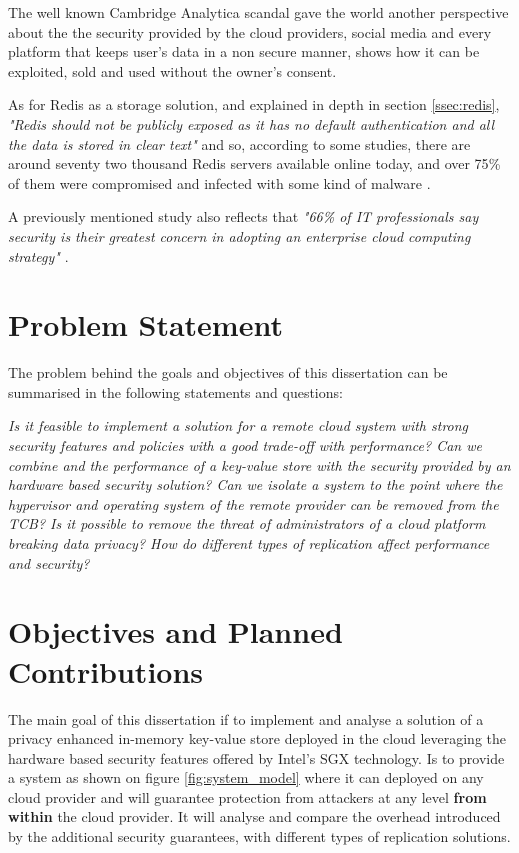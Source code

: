 The well known Cambridge Analytica scandal \cite{cambridge_analytica:1} gave the world another perspective about the the security provided by the cloud providers, social media and every platform that keeps user's data in a non secure manner, shows how it can be exploited, sold and used without the owner's consent.

As for Redis as a storage solution, and explained in depth in section \ref{ssec:redis}, \textit{"Redis should not be publicly exposed as it has no default authentication and all the data is stored in clear text"} and so, according to some studies, there are around seventy two thousand Redis servers available online today, and over 75{\%} of them were compromised and infected with some kind of malware \cite{redis_leak:1, redis_leak:2, redis_leak:3}.

A previously mentioned study also reflects that \textit{"66{\%} of IT professionals say security is their greatest concern in adopting an enterprise cloud computing strategy"} \cite{cloud_statistic:1}.


\section{Problem Statement} %
\label{sec:problem_statement}

The problem behind the goals and objectives of this dissertation can be summarised in the following statements and questions:

\textit{Is it feasible to implement a solution for a remote cloud system with strong security features and policies with a good trade-off with performance? Can we combine and the performance of a key-value store with the security provided by an hardware based security solution? Can we isolate a system to the point where the hypervisor and operating system of the remote provider can be removed from the \gls{TCB}? Is it possible to remove the threat of administrators of a cloud platform breaking data privacy? How do different types of replication affect performance and security?}

\section{Objectives and Planned Contributions} %
\label{sec:objectives_and_planned_contributions}

The main goal of this dissertation if to implement and analyse a solution of a privacy enhanced in-memory key-value store deployed in the cloud leveraging the hardware based security features offered by Intel's \gls{SGX} technology. Is to provide a system as shown on figure \ref{fig:system_model} where it can deployed on any cloud provider and will guarantee protection from attackers at any level \textbf{from within} the cloud provider. It will analyse and compare the overhead introduced by the additional security guarantees, with different types of replication solutions.

